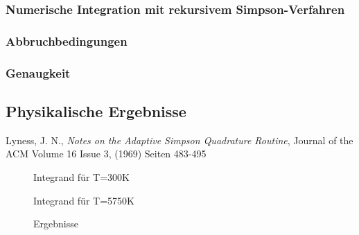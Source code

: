 \documentclass[10pt,a4paper]{article}
\begin{document}
\subsubsection{Numerische Integration mit rekursivem Simpson-Verfahren}


\subsubsection{Abbruchbedingungen}

\subsubsection{Genaugkeit}

\subsection{Physikalische Ergebnisse}
\begin{thebibliography}{9}

 Lyness, J. N.,
 \emph{Notes on the Adaptive Simpson Quadrature Routine},
Journal of the ACM
Volume 16 Issue 3, (1969) 
Seiten 483-495 

\end{thebibliography}

\appendix

\begin{figure}[htbp]
\centering

\caption{Integrand für T=300K}


\caption{Integrand für T=5750K}
\end{figure}

\begin{figure}
\centering

\caption{Ergebnisse}
\label{fig:ergebnisse}
\end{figure}
\end{document}

